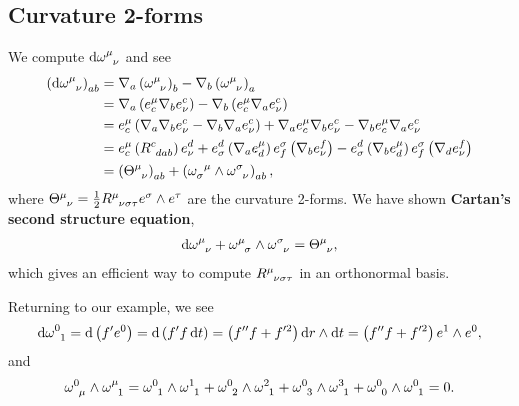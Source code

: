 \subsection{Curvature 2-forms}

We compute $\tensor{\dd{\omega}}{^{\mu}_{\nu}}$ and see
\begin{align}
    \left( \tensor{\dd{\omega}}{^{\mu}_{\nu}} \right)_{ab} &= \nabla_a \left( \tensor{\omega}{^{\mu}_{\nu}} \right)_{b} - \nabla_b \left( \tensor{\omega}{^{\mu}_{\nu}} \right)_a\\
    &= \nabla_a \left( e_{c}^{\mu} \nabla_b e^{c}_\nu \right) - \nabla_b \left( e_c^{\mu} \nabla_a e^{c}_\nu \right)  \\
    &= e_c^{\mu} \left( \nabla_a \nabla_b e^{c}_\nu - \nabla_b \nabla_a e^{c}_\nu\right)  + \nabla_a e_c^{\mu} \nabla_b e^{c}_\nu - \nabla_b e_c^{\mu} \nabla_a e^{c}_\nu\\
    &= e_c^{\mu} \left( \tensor{R}{^{c}_{dab}} \right) e^{d}_\nu + e^{d}_{\sigma} \left( \nabla_a e_d^{\mu} \right)  e_{f}^{\sigma} \left( \nabla_b e^{f}_{\nu} \right)  - e^{d}_{\sigma} \left( \nabla_b e_{d}^{\mu} \right) e_f^{\sigma} \left( \nabla_d e^{f}_\nu \right)   \\
    &= \left( \tensor{\Theta}{^{\mu}_{\nu}} \right)_{ab} + \left( \tensor{\omega}{_{\sigma}^{\mu}} \wedge \tensor{\omega}{^{\sigma}_{\nu}} \right)_{ab}
,\end{align}
where $\tensor{\Theta}{^{\mu}_{\nu}} = \frac{1}{2} \tensor{R}{^{\mu}_{\nu \sigma \tau}} e^{\sigma} \wedge e^{\tau}$ are the curvature 2-forms. We have shown \textbf{Cartan's second structure equation},
\begin{align}
    \tensor{\dd{\omega}}{^{\mu}_{\nu}} + \tensor{\omega}{^{\mu}_{\sigma}} \wedge \tensor{\omega}{^{\sigma}_{\nu}} = \tensor{\Theta}{^{\mu}_{\nu}}
,\end{align}
which gives an efficient way to compute $\tensor{R}{^{\mu}_{\nu \sigma \tau}}$ in an orthonormal basis.

Returning to our example, we see
\begin{align}
    \tensor{\dd{\omega}}{^{0}_1} = \dd{\left( f' e^{0} \right) } = \dd{\left( f' f \dd{t} \right) } = \left( f'' f + f'^2 \right) \dd{r} \wedge \dd{t} = \left( f'' f + f'^2 \right) e^{1} \wedge e^{0}
,\end{align}
and 
\begin{align}
    \tensor{\omega}{^{0}_{\mu}} \wedge \tensor{\omega}{^{\mu}_1} = \tensor{\omega}{^{0}_1} \wedge \tensor{\omega}{^{1}_1} + \tensor{\omega}{^{0}_2} \wedge \tensor{\omega}{^{2}_1} + \tensor{\omega}{^{0}_3} \wedge \tensor{\omega}{^{3}_1} + \tensor{\omega}{^{0}_0} \wedge \tensor{\omega}{^{0}_1} = 0
.\end{align}


